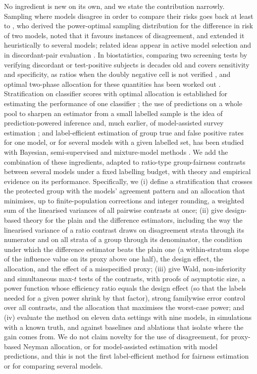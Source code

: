 No ingredient is new on its own, and we state the contribution narrowly. Sampling where models disagree in order to compare their risks goes back at least to \citet{sawade2012active}, who derived the power-optimal sampling distribution for the difference in risk of two models, noted that it favours instances of disagreement, and extended it heuristically to several models; related ideas appear in active model selection \citep{hara2024,kay2025coda} and in discordant-pair evaluation \citep{musgrove2023discordant}. In biostatistics, comparing two screening tests by verifying discordant or test-positive subjects is decades old and covers sensitivity and specificity, as ratios when the doubly negative cell is not verified \citep{schatzkin1987,chock1997,pepe2001comparing}, and optimal two-phase allocation for these quantities has been worked out \citep{mcnamee2002}. Stratification on classifier scores with optimal allocation is established for estimating the performance of one classifier \citep{bennett2010online,kumar2018classifier,fisch2024stratppi}; the use of predictions on a whole pool to sharpen an estimator from a small labelled sample is the idea of prediction-powered inference \citep{angelopoulos2023ppi,fisch2024stratppi} and, much earlier, of model-assisted survey estimation \citep{sarndal1992,breidt2017}; and label-efficient estimation of group true and false positive rates for one model, or for several models with a given labelled set, has been studied with Bayesian, semi-supervised and mixture-model methods \citep{ji2020fairness,gao2025,shanmugam2025}. We add the combination of these ingredients, adapted to ratio-type group-fairness contrasts between several models under a fixed labelling budget, with theory and empirical evidence on its performance. Specifically, we (i) define a stratification that crosses the protected group with the models' agreement pattern and an allocation that minimises, up to finite-population corrections and integer rounding, a weighted sum of the linearised variances of all pairwise contrasts at once; (ii) give design-based theory for the plain and the difference estimators, including the way the linearised variance of a ratio contrast draws on disagreement strata through its numerator and on all strata of a group through its denominator, the condition under which the difference estimator beats the plain one (a within-stratum slope of the influence value on its proxy above one half), the design effect, the allocation, and the effect of a misspecified proxy; (iii) give Wald, non-inferiority and simultaneous max-$t$ tests of the contrasts, with proofs of asymptotic size, a power function whose efficiency ratio equals the design effect (so that the labels needed for a given power shrink by that factor), strong familywise error control over all contrasts, and the allocation that maximises the worst-case power; and (iv) evaluate the method on eleven data settings with nine models, in simulations with a known truth, and against baselines and ablations that isolate where the gain comes from. We do not claim novelty for the use of disagreement, for proxy-based Neyman allocation, or for model-assisted estimation with model predictions, and this is not the first label-efficient method for fairness estimation or for comparing several models.

